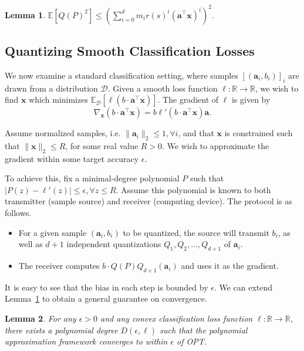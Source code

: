 \documentclass{article}
\newcommand{\R}{\mathbb{R}}
\renewcommand{\vec}[1]{\mathbf{#1}}
\def\E{\mathbb{E}}
\newtheorem{lemma}{Lemma}
\begin{document}
\begin{lemma}
\label{lem:poly-sec-moment-bound}
	$\E[ Q(P)^2 ] \leq \left(\sum_{i = 0}^d m_i r(s)^i (\vec{a}^\top \vec{x})^i\right)^2.$
\end{lemma} 


\subsection{Quantizing Smooth Classification Losses}

We now examine a standard classification setting, where samples $[(\vec{a}_i, b_i)]_i$ are drawn from a distribution $\mathcal{D}$. Given a smooth loss function $\ell: \R \rightarrow \R$, we wish to find $\vec{x}$ which minimizes $\E_{\mathcal{D}} [ \ell( b \cdot \vec{a}^\top \vec{x}) ]$. The gradient of $\ell$ is given by 
$$ \nabla_\vec{x} (b \cdot \vec{a}^\top \vec{x}) = b \ell' (b \cdot \vec{a}^\top \vec{x}) \vec{a}.$$

Assume normalized samples, i.e. $\| \vec{a}_i \|_2 \leq 1, \forall i$, and that $\vec{x}$ is constrained such that $\| \vec{x} \|_2 \leq R$, for some real value $R > 0$. We wish to approximate the gradient within some target accuracy $\epsilon$. 

To achieve this, fix a minimal-degree polynomial $P$ such that $|P(z) - \ell'(z)| \leq \epsilon, \forall z \leq R$. Assume this polynomial is known to both transmitter (sample source) and receiver (computing device). The protocol is as follows. 
\begin{itemize}
	\item For a given sample $(\vec{a}_i, b_i)$ to be quantized, the source will transmit $b_i$, as well as $d + 1$ independent quantizations $Q_1, Q_2, \ldots, Q_{d + 1}$ of $\vec{a}_i$. 
	\item The receiver computes $b \cdot Q(P) Q_{d + 1} ( \vec{a}_i )$ and uses it as the gradient.
\end{itemize}

It is easy to see that the bias in each step is bounded by $\epsilon$. 
We can extend Lemma~\ref{lem:poly-sec-moment-bound} to obtain a general guarantee on convergence. 

\begin{lemma} \label{lem:OPT}
	For any $\epsilon > 0$ and any convex classification loss function $\ell: \R \rightarrow \R$, there exists a polynomial degree $D(\epsilon, \ell)$ such that the polynomial approximation framework converges to within $\epsilon$ of OPT.  
\end{lemma}
\end{document}
